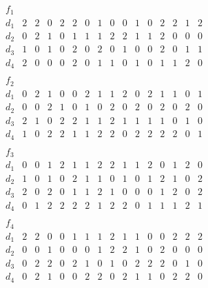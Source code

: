 $$\begin{array}{c|ccccccccccccccc} 
f_1 &&&&&&&&&&&&&&&\\ 
\hline 
d_1 & 2& 2& 0& 2& 2& 0& 1& 0& 0& 1& 0& 2& 2& 1& 2\\ 
d_2 & 0& 2& 1& 0& 1& 1& 1& 2& 2& 1& 1& 2& 0& 0& 0\\ 
d_3 & 1& 0& 1& 0& 2& 0& 2& 0& 1& 0& 0& 2& 0& 1& 1\\ 
d_4 & 2& 0& 0& 0& 2& 0& 1& 1& 0& 1& 0& 1& 1& 2& 0\\ 
\end{array}$$ 
$$\begin{array}{c|ccccccccccccccc} 
f_2 &&&&&&&&&&&&&&&\\ 
\hline 
d_1 & 0& 2& 1& 0& 0& 2& 1& 1& 2& 0& 2& 1& 1& 0& 1\\ 
d_2 & 0& 0& 2& 1& 0& 1& 0& 2& 0& 2& 0& 2& 0& 2& 0\\ 
d_3 & 2& 1& 0& 2& 2& 1& 1& 2& 1& 1& 1& 1& 0& 1& 0\\ 
d_4 & 1& 0& 2& 2& 1& 1& 2& 2& 0& 2& 2& 2& 2& 0& 1\\ 
\end{array}$$ 
$$\begin{array}{c|ccccccccccccccc} 
f_3 &&&&&&&&&&&&&&&\\ 
\hline 
d_1 & 0& 0& 1& 2& 1& 1& 2& 2& 1& 1& 2& 0& 1& 2& 0\\ 
d_2 & 1& 0& 1& 0& 2& 1& 1& 0& 1& 0& 1& 2& 1& 0& 2\\ 
d_3 & 2& 0& 2& 0& 1& 1& 2& 1& 0& 0& 0& 1& 2& 0& 2\\ 
d_4 & 0& 1& 2& 2& 2& 2& 1& 2& 2& 0& 1& 1& 1& 2& 1\\ 
\end{array}$$ 
$$\begin{array}{c|ccccccccccccccc} 
f_4 &&&&&&&&&&&&&&&\\ 
\hline 
d_1 & 2& 2& 0& 0& 1& 1& 1& 2& 1& 1& 0& 0& 2& 2& 2\\ 
d_2 & 0& 0& 1& 0& 0& 0& 1& 2& 2& 1& 0& 2& 0& 0& 0\\ 
d_3 & 0& 2& 2& 0& 2& 1& 0& 1& 0& 2& 2& 2& 0& 1& 0\\ 
d_4 & 0& 2& 1& 0& 0& 2& 2& 0& 2& 1& 1& 0& 2& 2& 0\\ 
\end{array}$$ 
